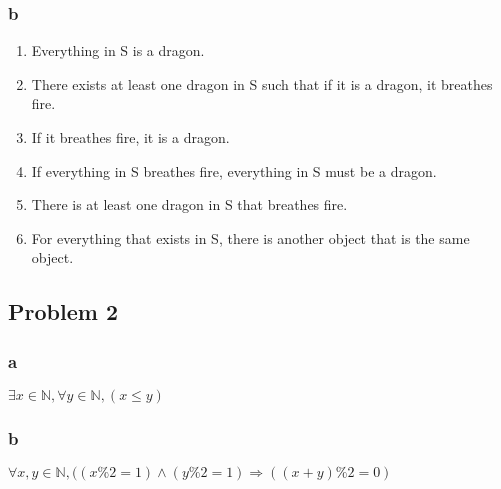 \documentclass[14pt]{extarticle}
\begin{document}
\subsubsection*{b}
\begin{enumerate}[i]
\item Everything in S is a dragon.
\item There exists at least one dragon in S such that if it is a dragon, it breathes fire.
\item If it breathes fire, it is a dragon.
\item If everything in S breathes fire, everything in S must be a dragon.
\item There is at least one dragon in S that breathes fire.
\item For everything that exists in S, there is another object that is the same object.
\end{enumerate}


\subsection*{Problem 2}
\subsubsection*{a}

$\exists x \in \mathbb{N}, \forall y \in \mathbb{N}, (x \leq y)$

\subsubsection*{b}
$\forall x, y \in \mathbb{N}, ((x  \%  2 = 1) \land (y \% 2 = 1) \Rightarrow ((x+y)\%2=0) $
\end{document}
